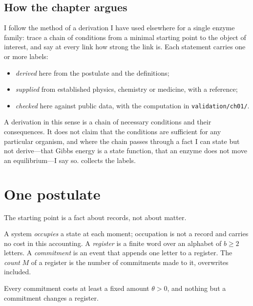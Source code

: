 \subsection*{How the chapter argues}

I follow the method of a derivation I have used elsewhere for a single
enzyme family: trace a chain of conditions from a minimal starting point to
the object of interest, and say at every link how strong the link is. Each
statement carries one or more labels:
\begin{itemize}[nosep]
\item \lnkD{} \emph{derived} here from the postulate and the definitions;
\item \lnkS{} \emph{supplied} from established physics, chemistry or
      medicine, with a reference;
\item \lnkC{} \emph{checked} here against public data, with the computation
      in \texttt{validation/ch01/}.
\end{itemize}
A derivation in this sense is a chain of necessary conditions and their
consequences. It does not claim that the conditions are sufficient for any
particular organism, and where the chain passes through a fact I can state
but not derive---that Gibbs energy is a state function, that an enzyme does
not move an equilibrium---I say so.  collects the labels.

\section{One postulate}
\label{c1:sec-postulate}

The starting point is a fact about records, not about matter.

\begin{definition}
\label{c1:def-commitment}
A system \emph{occupies} a state at each moment; occupation is not a record
and carries no cost in this accounting. A \emph{register} is a finite word
over an alphabet of $b\ge2$ letters. A \emph{commitment} is an event that
appends one letter to a register. The \emph{count} $M$ of a register is the
number of commitments made to it, overwrites included.
\end{definition}

\begin{postulate}
\label{c1:post-counted}
Every commitment costs at least a fixed amount $\theta>0$, and nothing but a
commitment changes a register.
\end{postulate}

